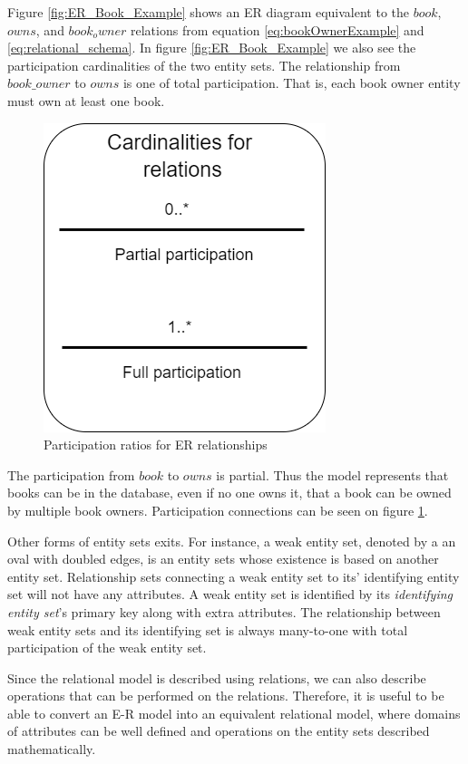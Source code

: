 Figure \ref{fig:ER_Book_Example} shows an ER diagram equivalent to the $book$, $owns$, and $book_owner$ relations from equation \ref{eq:bookOwnerExample} and \ref{eq:relational_schema}.
In figure \ref{fig:ER_Book_Example} we also see the participation cardinalities of the two entity sets. 
The relationship from $book\_owner$ to $owns$ is one of total participation. That is, each book owner entity must own at least one book.
\begin{figure}[h]
    \centering
    \includegraphics[scale=0.5]{Images/cardinalities.png}
    \caption{Participation ratios for ER relationships}
    \label{fig:ERDiagram_Cardinality}
\end{figure}
The participation from $book$ to $owns$ is partial. Thus the model represents that books can be in the database, even if no one owns it, that a book can be owned by multiple book owners.
Participation connections can be seen on figure \ref{fig:ERDiagram_Cardinality}.


Other forms of entity sets exits. For instance, a weak entity set, denoted by a an oval with doubled edges, is an entity sets whose existence is based on another entity set. Relationship sets connecting a weak entity set to its' identifying entity set will not have any attributes.
A weak entity set is identified by its \textit{identifying entity set}'s primary key along with extra attributes. 
The relationship between weak entity sets and its identifying set is always many-to-one with total  participation of the weak entity set.

Since the relational model is described using relations, we can also describe operations that can be performed on the relations.
Therefore, it is useful to be able to convert an E-R model into an equivalent relational model, where domains of attributes can be well defined and operations on the entity sets described mathematically.

